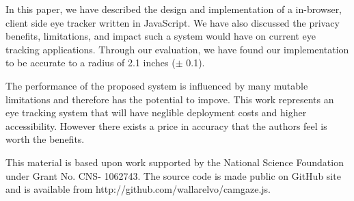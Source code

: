 \documentclass[annual]{acmsiggraph}
\begin{document}
In this paper, we have described the design and implementation of a in-browser,
client side eye tracker written in JavaScript. We have also discussed the
privacy benefits, limitations, and impact such a system would have on current
eye tracking applications. Through our evaluation, we have found our
implementation to be accurate to a radius of 2.1 inches ($\pm$ 0.1).

The performance of the proposed system is influenced by many mutable
limitations and therefore has the potential to impove. This work represents an
eye tracking system that will have neglible deployment costs and higher
accessibility. However there exists a price in accuracy that the authors feel
is worth the benefits.

This material is based upon work supported by the National Science Foundation
under Grant No. CNS- 1062743. The source code is made public on GitHub site and
is available from http://github.com/wallarelvo/camgaze.js.



\end{document}
